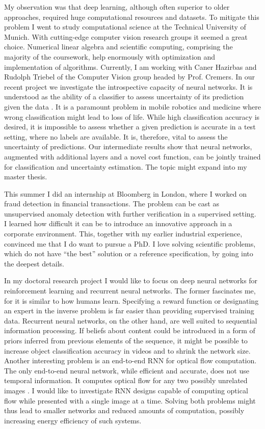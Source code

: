 \documentclass[12pt]{article}
\begin{document}
My observation was that deep learning, although often superior to older approaches, required huge computational resources and datasets. To mitigate this problem I went to study computational science at the Technical University of Munich. With cutting-edge computer vision research groups it seemed a great choice. Numerical linear algebra and scientific computing, comprising the majority of the coursework, help enormously with optimization and implementation of algorithms. Currently, I am working with Caner Hazirbas and Rudolph Triebel of the Computer Vision group headed by Prof. Cremers. In our recent project we investigate the introspective capacity of neural networks. It is understood as the ability of a classifier to assess uncertainty of its prediction given the data \cite{introspective}. It is a paramount problem in mobile robotics and medicine where wrong classification might lead to loss of life. While high classification accuracy is desired, it is impossible to assess whether a given prediction is accurate in a test setting, where no labels are available. It is, therefore, vital to assess the uncertainty of predictions. Our intermediate results show that neural networks, augmented with additional layers and a novel cost function, can be jointly trained for classification and uncertainty estimation. The topic might expand into my master thesis.

This summer I did an internship at Bloomberg in London, where I worked on fraud detection in financial transactions. The problem can be cast as unsupervised anomaly detection with further verification in a supervised setting. I learned how difficult it can be to introduce an innovative approach in a corporate environment. This, together with my earlier industrial experience, convinced me that I do want to pursue a PhD. I love solving scientific problems, which do not have ``the best'' solution or a reference specification, by going into the deepest details.

In my doctoral research project I would like to focus on deep neural networks for reinforcement learning and recurrent neural networks. The former fascinates me, for it is similar to how humans learn. Specifying a reward function  or designating an expert in the inverse problem is far easier than providing supervised training data. Recurrent neural networks, on the other hand, are well suited to sequential information processing. If beliefs about content could be introduced in a form of priors inferred from previous elements of the sequence, it might be possible to increase object classification accuracy in videos and to shrink the network size. Another interesting problem is an end-to-end RNN for optical flow computation. The only end-to-end neural network, while efficient and accurate, does not use temporal information. It computes optical flow for any two possibly unrelated images \cite{flownet}. I would like to investigate RNN designs capable of computing optical flow while presented with a single image at a time. Solving both problems might thus lead to smaller networks and reduced amounts of computation, possibly increasing energy efficiency of such systems. 
\end{document}
